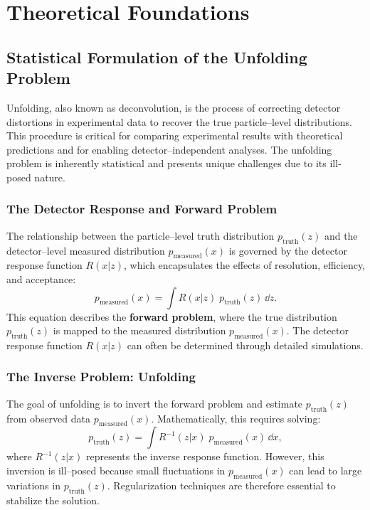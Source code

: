 \chapter{Theoretical Foundations}
\section{Statistical Formulation of the Unfolding Problem}

Unfolding, also known as deconvolution, is the process of correcting detector distortions in experimental data to recover the true particle--level distributions.
%
This procedure is critical for comparing experimental results with theoretical predictions and for enabling detector--independent analyses.
%
The unfolding problem is inherently statistical and presents unique challenges due to its ill-posed nature.

\subsection{The Detector Response and Forward Problem}

The relationship between the particle--level truth distribution \(p_{\text{truth}}(z)\) and the detector--level measured distribution \(p_{\text{measured}}(x)\) is governed by the detector response function \(R(x|z)\), which encapsulates the effects of resolution, efficiency, and acceptance:
\begin{equation}
    p_{\text{measured}}(x) = \int R(x|z)\; p_{\text{truth}}(z) \, \dd z.
\end{equation}
This equation describes the \textbf{forward problem}, where the true distribution \(p_{\text{truth}}(z)\) is mapped to the measured distribution \(p_{\text{measured}}(x)\). The detector response function \(R(x|z)\) can often be determined through detailed simulations.

\subsection{The Inverse Problem: Unfolding}

The goal of unfolding is to invert the forward problem and estimate \(p_{\text{truth}}(z)\) from observed data \(p_{\text{measured}}(x)\). Mathematically, this requires solving:
\begin{equation}
    p_{\text{truth}}(z) = \int R^{-1}(z|x) \;p_{\text{measured}}(x) \, \dd x,
\end{equation}
where \(R^{-1}(z|x)\) represents the inverse response function.
%
However, this inversion is ill--posed because small fluctuations in \(p_{\text{measured}}(x)\) can lead to large variations in \(p_{\text{truth}}(z)\).
%
Regularization techniques are therefore essential to stabilize the solution.

